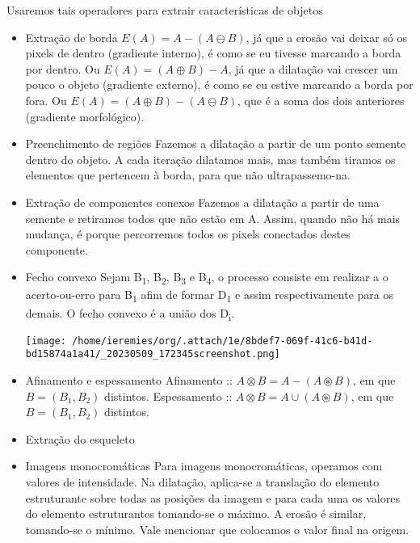 \documentclass[twocolumn, 10pt]{article}
\begin{document}
Usaremos tais operadores para extrair características de objetos
\begin{itemize}
\item Extração de borda
\label{sec:org922d9f2}
\(E(A) = A - (A \ominus B)\), já que a erosão vai deixar só os pixels de dentro (gradiente interno), é como se eu tivesse marcando a borda por dentro.
Ou \(E(A) = (A \oplus B) - A\), já que a dilatação vai crescer um pouco o objeto (gradiente externo), é como se eu estive marcando a borda por fora.
Ou \(E(A) = (A \oplus B) - (A \ominus B)\), que é a soma dos dois anteriores (gradiente morfológico).
\item Preenchimento de regiões
\label{sec:orgea768f4}
Fazemos a dilatação a partir de um ponto semente dentro do objeto. A cada iteração dilatamos mais, mas também tiramos os elementos que pertencem à borda, para que não ultrapassemo-na.
\item Extração de componentes conexos
\label{sec:orgf0ef213}
Fazemos a dilatação a partir de uma semente e retiramos todos que não estão em A. Assim, quando não há mais mudança, é porque percorremos todos os pixels conectados destes componente.
\item Fecho convexo
\label{sec:org06a6e14}
Sejam B\textsubscript{1}, B\textsubscript{2}, B\textsubscript{3} e B\textsubscript{4}, o processo consiste em realizar a o acerto-ou-erro para B\textsubscript{1} afim de formar D\textsubscript{1} e assim respectivamente para os demais. O fecho convexo é a união dos D\textsubscript{i}.
\begin{center}
\texttt{[image: /home/ieremies/org/.attach/1e/8bdef7-069f-41c6-b41d-bd15874a1a41/\_20230509\_172345screenshot.png]}
\end{center}

\item Afinamento e espessamento
\label{sec:org52e5592}
Afinamento :: \(A \otimes B = A - (A \circledast B)\), em que \(B = (B_1, B_2)\) distintos.
Espessamento :: \(A \otimes B = A \cup (A \circledast B)\), em que \(B = (B_1, B_2)\) distintos.
\item Extração do esqueleto
\label{sec:org2a8d848}
\item Imagens monocromáticas
\label{sec:org89e1b10}
Para imagens monocromáticas, operamos com valores de intensidade.
Na dilatação, aplica-se a translação do elemento estruturante sobre todas as posições da imagem e para cada uma os valores do elemento estruturantes tomando-se o máximo.
A erosão é similar, tomando-se o mínimo. Vale mencionar que colocamos o valor final na origem.


\end{itemize}
\end{document}
